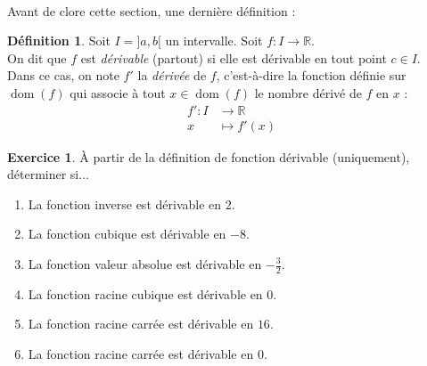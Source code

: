 \documentclass[a4paper,fontsize=13pt]{scrreprt}
\theoremstyle{plain}
\theoremstyle{definition}
\newtheorem{déf}[subsection]{Définition}
\newtheorem{exo}[subsection]{Exercice}
\newtheorem*{solu}{Solution}
\newcommand{\rr}{\mathbb{R}}
\DeclareMathOperator{\dom}{dom}
\begin{document}
~~\\
Avant de clore cette section, une dernière définition :
\begin{déf}
	Soit $I = ]a,b[$ un intervalle. Soit $f : I \to \rr$. \\On dit que $f$ est \emph{dérivable} (partout) si elle est dérivable en tout point $c \in I$. \\Dans ce cas, on note $f'$ la \emph{dérivée} de $f$, c'est-à-dire la fonction définie sur $\dom(f)$ qui associe à tout $x \in \dom(f)$ le nombre dérivé de $f$ en $x$ :
	\begin{align*}
	f' : I &\to \rr \\
	x &\mapsto f'(x)
	\end{align*}
\end{déf}

\begin{exo} \label{exodef}
	À partir de la définition de fonction dérivable (uniquement), déterminer si...
	\begin{enumerate}
		\item La fonction inverse est dérivable en $2$.
		\item La fonction cubique est dérivable en $-8$.
		\item La fonction valeur absolue est dérivable en $-\frac{3}{2}$.
		\item La fonction racine cubique est dérivable en $0$.
		\item La fonction racine carrée est dérivable en $16$.
		\item La fonction racine carrée est dérivable en $0$.
	\end{enumerate}
\end{exo}
\end{document}
